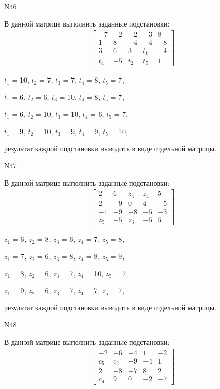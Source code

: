 \documentclass[11pt]{report}
\begin{document}
N46

В данной матрице выполнить заданные подстановки:
\begin{align*}
\left[\begin{matrix}-7 & -2 & -2 & -3 & 8\\1 & 8 & -4 & -4 & -8\\3 & 6 & 3 & t_{1} & -4\\t_{4} & -5 & t_{2} & t_{5} & 1\end{matrix}\right]
\end{align*}


$t_{1}$ = 10, $t_{2}$ = 7, $t_{3}$ = 7, $t_{4}$ = 8, $t_{5}$ = 7, 

$t_{1}$ = 6, $t_{2}$ = 6, $t_{3}$ = 10, $t_{4}$ = 8, $t_{5}$ = 7, 

$t_{1}$ = 6, $t_{2}$ = 10, $t_{3}$ = 10, $t_{4}$ = 6, $t_{5}$ = 7, 

$t_{1}$ = 9, $t_{2}$ = 10, $t_{3}$ = 9, $t_{4}$ = 9, $t_{5}$ = 10, 

результат каждой подстановки выводить в виде отдельной матрицы.

N47

В данной матрице выполнить заданные подстановки:
\begin{align*}
\left[\begin{matrix}2 & 6 & z_{4} & z_{1} & 5\\2 & -9 & 0 & 4 & -5\\-1 & -9 & -8 & -5 & -3\\z_{5} & -5 & z_{3} & -5 & 5\end{matrix}\right]
\end{align*}


$z_{1}$ = 6, $z_{2}$ = 8, $z_{3}$ = 6, $z_{4}$ = 7, $z_{5}$ = 8, 

$z_{1}$ = 7, $z_{2}$ = 6, $z_{3}$ = 8, $z_{4}$ = 8, $z_{5}$ = 9, 

$z_{1}$ = 8, $z_{2}$ = 6, $z_{3}$ = 7, $z_{4}$ = 10, $z_{5}$ = 7, 

$z_{1}$ = 9, $z_{2}$ = 6, $z_{3}$ = 7, $z_{4}$ = 7, $z_{5}$ = 7, 

результат каждой подстановки выводить в виде отдельной матрицы.

N48

В данной матрице выполнить заданные подстановки:
\begin{align*}
\left[\begin{matrix}-2 & -6 & -4 & 1 & -2\\c_{5} & c_{2} & -9 & -4 & 1\\2 & -8 & -7 & 8 & 2\\c_{4} & 9 & 0 & -2 & -7\end{matrix}\right]
\end{align*}
\end{document}
